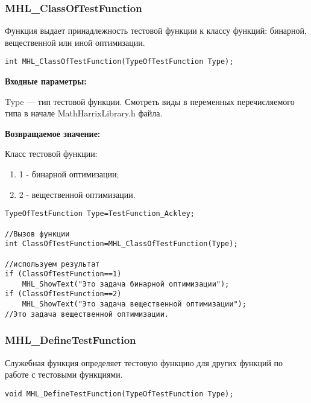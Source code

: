 \documentclass[a4paper,12pt]{article}
\begin{document}
\subsubsection{MHL\_ClassOfTestFunction}\label{MHL_ClassOfTestFunction}

Функция выдает принадлежность тестовой функции к классу функций: бинарной, вещественной или иной оптимизации.


\begin{lstlisting}[label=code_syntax_MHL_ClassOfTestFunction,caption=Синтаксис]
int MHL_ClassOfTestFunction(TypeOfTestFunction Type);
\end{lstlisting}

\textbf{Входные параметры:}

Type --- тип тестовой функции. Смотреть виды в переменных перечисляемого типа в начале MathHarrixLibrary.h файла.

\textbf{Возвращаемое значение:}

Класс тестовой функции:

\begin{enumerate}
\item 1 - бинарной оптимизации;
\item 2 - вещественной оптимизации.
\end{enumerate}


\begin{lstlisting}[label=code_use_MHL_ClassOfTestFunction,caption=Пример использования]
TypeOfTestFunction Type=TestFunction_Ackley;

//Вызов функции
int ClassOfTestFunction=MHL_ClassOfTestFunction(Type);

//используем результат
if (ClassOfTestFunction==1)
    MHL_ShowText("Это задача бинарной оптимизации");
if (ClassOfTestFunction==2)
    MHL_ShowText("Это задача вещественной оптимизации");
//Это задача вещественной оптимизации.
\end{lstlisting}

\subsubsection{MHL\_DefineTestFunction}\label{MHL_DefineTestFunction}

Служебная функция определяет тестовую функцию для других функций по работе с тестовыми функциями.


\begin{lstlisting}[label=code_syntax_MHL_DefineTestFunction,caption=Синтаксис]
void MHL_DefineTestFunction(TypeOfTestFunction Type);
\end{lstlisting}
\end{document}
